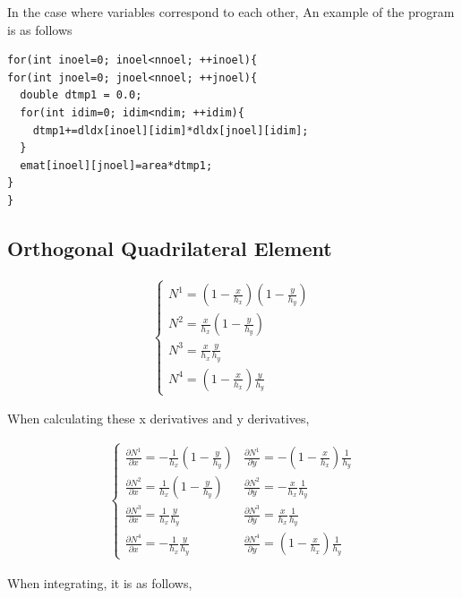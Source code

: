 In the case where variables correspond to each other,
An example of the program is as follows


\begin {lstlisting}[frame=single, caption=C++ code to compute an element stiffness matrix]
for(int inoel=0; inoel<nnoel; ++inoel){
for(int jnoel=0; jnoel<nnoel; ++jnoel){
  double dtmp1 = 0.0;
  for(int idim=0; idim<ndim; ++idim){
    dtmp1+=dldx[inoel][idim]*dldx[jnoel][idim];
  }
  emat[inoel][jnoel]=area*dtmp1;
}
}
\end{lstlisting}

\subsection{Orthogonal Quadrilateral Element}

\begin{eqnarray}
\left\{\begin{array}{l}
N^1=(1-\frac{x}{h_x})(1-\frac{y}{h_y})\\
N^2=\frac{x}{h_x}(1-\frac{y}{h_y})\\
N^3=\frac{x}{h_x}\frac{y}{h_y}\\
N^4=(1-\frac{x}{h_x})\frac{y}{h_y}
\end{array}\right.
\end{eqnarray}


When calculating these x derivatives and y derivatives,

\begin{eqnarray}
\left\{\begin{array}{ll}
\frac{\partial N^1}{\partial x}=-\frac{1}{h_x}(1-\frac{y}{h_y})   &   \frac{\partial N^1}{\partial y}=-(1-\frac{x}{h_x})\frac{1}{h_y}\\      \frac{\partial N^2}{\partial x}=\frac{1}{h_x}(1-\frac{y}{h_y})   &   \frac{\partial N^2}{\partial y}=-\frac{x}{h_x}\frac{1}{h_y}\\
\frac{\partial N^3}{\partial x}=\frac{1}{h_x}\frac{y}{h_y}   &   \frac{\partial N^3}{\partial y}=\frac{x}{h_x}\frac{1}{h_y}\\
\frac{\partial N^4}{\partial x}=-\frac{1}{h_x}\frac{y}{h_y}   &   \frac{\partial N^4}{\partial y}=(1-\frac{x}{h_x})\frac{1}{h_y}
\end{array}\right.
\end{eqnarray}


When integrating, it is as follows,

